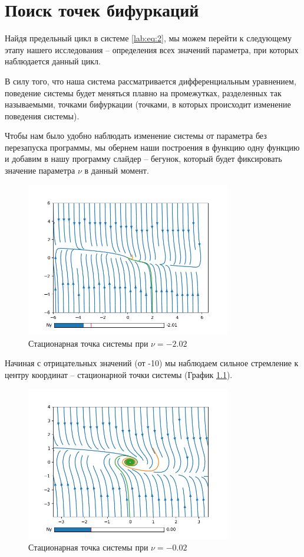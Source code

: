 \chapter{Поиск точек бифуркаций}

Найдя предельный цикл в системе \ref{lab:eq:2}, мы можем перейти к следующему этапу нашего 
исследования -- определения всех значений параметра, при которых наблюдается данный цикл.

В силу того, что наша система рассматривается дифференциальным уравнением, поведение
системы будет меняться плавно на промежутках, разделенных так называемыми, точками бифуркации 
(точками, в которых происходит изменение поведения системы).

Чтобы нам было удобно наблюдать изменение системы от параметра без перезапуска программы,
мы обернем наши построения в функцию одну функцию и добавим в нашу программу слайдер --
бегунок, который будет фиксировать значение параметра $\nu$ в данный момент.

\begin{figure}
    \centering
    \includegraphics[width=0.8\textwidth]{figures/2_point_-2_02}
    \caption{Стационарная точка системы при $\nu = -2.02$}
    \label{lab2:point_-2}
\end{figure}

Начиная с отрицательных значений (от -10) мы наблюдаем сильное стремление
к центру координат -- стационарной точки системы (График \ref{lab2:point_-2}).

\begin{figure}[!ht]
    \centering
    \includegraphics[width=0.8\textwidth]{figures/2_point_0}
    \caption{Стационарная точка системы при $\nu = -0.02$}
    \label{lab2:point_0}
\end{figure}

